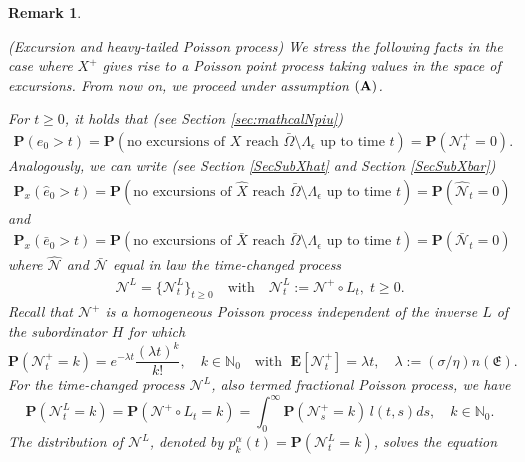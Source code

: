 \documentclass[11pt,a4paper]{article}
\newtheorem{remark}{Remark}[section]
\newcommand{\magenta}{black}
\begin{document}
\begin{remark}
\label{rmk:PPPlast}
{\color{\magenta}
(Excursion and heavy-tailed Poisson process) We stress the following facts in the case where $X^+$ gives rise to a Poisson point process taking values in the space of excursions. From now on, we proceed under assumption ${\bf (A)}$. 

For $t \geq 0$, it holds that (see Section \ref{sec:mathcalNpiu})
\begin{align*}
\mathbf{P}(e_0 > t) = \mathbf{P}(\textrm{no excursions of $X$ reach $\bar{\Omega} \setminus \Lambda_\epsilon$ up to time $t$}) = \mathbf{P}(\mathcal{N}^+_{t} = 0). 
\end{align*}
Analogously, we can write (see Section \ref{SecSubXhat} and Section \ref{SecSubXbar})
\begin{align*}
\mathbf{P}_x(\hat{e}_0 > t) = \mathbf{P}(\textrm{no excursions of $\hat{X}$ reach $\bar{\Omega} \setminus \Lambda_\epsilon$ up to time $t$}) = \mathbf{P}(\hat{\mathcal{N}}_{t} = 0) 
\end{align*}
and
\begin{align*}
\mathbf{P}_x(\bar{e}_0 > t) = \mathbf{P}(\textrm{no excursions of $\bar{X}$ reach $\bar{\Omega} \setminus \Lambda_\epsilon$ up to time $t$}) = \mathbf{P}(\bar{\mathcal{N}}_{t} = 0) 
\end{align*}
where $\hat{\mathcal{N}}$ and $\bar{\mathcal{N}}$ equal in law the time-changed process 
\begin{align*}
\mathcal{N}^L=\{\mathcal{N}^L_t\}_{t \geq 0} \quad \textrm{with} \quad \mathcal{N}^L_t:=\mathcal{N}^+ \circ L_t,\;  t \geq 0.
\end{align*}
Recall that $\mathcal{N}^+$ is a homogeneous Poisson process independent of the inverse $L$ of the subordinator $H$ for which
\begin{equation*}
\mathbf{P}(\mathcal{N}^+_t = k) = e^{-\lambda t} \frac{(\lambda t)^k}{k!} , \quad k \in \mathbb{N}_0 \quad  \textrm{with }\; \mathbf{E}[\mathcal{N}^+_t] = \lambda t , \quad \lambda :=(\sigma/\eta) n(\mathfrak{E}).
\end{equation*} 
For the time-changed process $\mathcal{N}^L$,  also termed fractional Poisson process, we have
\begin{equation*}
\mathbf{P}(\mathcal{N}^L_t = k) = \mathbf{P}(\mathcal{N}^+ \circ L_t = k) = \int_0^\infty \mathbf{P}(\mathcal{N}^+_s = k)\, l(t,s)ds , \quad k \in \mathbb{N}_0.
\end{equation*}
The distribution of $\mathcal{N}^L$, denoted by $p_k^\alpha(t) = \mathbf{P}(\mathcal{N}^L_t = k)$, solves the equation 
}
\end{remark}
\end{document}
